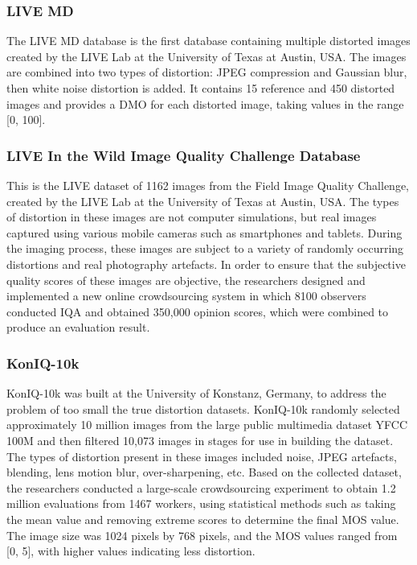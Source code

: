 \documentclass{article}
\begin{document}
\subsubsection{LIVE MD}
\label{LIVE MD}

The LIVE MD database \cite{jayaraman2012objective} is the first database containing multiple distorted images created by the LIVE Lab at the University of Texas at Austin, USA. The images are combined into two types of distortion: JPEG compression and Gaussian blur, then white noise distortion is added. It contains 15 reference and 450 distorted images and provides a DMO for each distorted image, taking values in the range [0, 100].

\subsubsection{LIVE In the Wild Image Quality Challenge Database}
\label{LIVE WILD}

This is the LIVE dataset \cite{ghadiyaram2015massive} of 1162 images from the Field Image Quality Challenge, created by the LIVE Lab at the University of Texas at Austin, USA. The types of distortion in these images are not computer simulations, but real images captured using various mobile cameras such as smartphones and tablets. During the imaging process, these images are subject to a variety of randomly occurring distortions and real photography artefacts. In order to ensure that the subjective quality scores of these images are objective, the researchers designed and implemented a new online crowdsourcing system in which 8100 observers conducted IQA and obtained 350,000 opinion scores, which were combined to produce an evaluation result.

\subsubsection{KonIQ-10k}
\label{K-10k}
KonIQ-10k \cite{lin2018koniq} was built at the University of Konstanz, Germany, to address the problem of too small the true distortion datasets. KonIQ-10k randomly selected approximately 10 million images from the large public multimedia dataset YFCC 100M \cite{thomee2016yfcc100m} and then filtered 10,073 images in stages for use in building the dataset. The types of distortion present in these images included noise, JPEG artefacts, blending, lens motion blur, over-sharpening, etc. Based on the collected dataset, the researchers conducted a large-scale crowdsourcing experiment to obtain 1.2 million evaluations from 1467 workers, using statistical methods such as taking the mean value and removing extreme scores to determine the final MOS value. The image size was 1024 pixels by 768 pixels, and the MOS values ranged from [0, 5], with higher values indicating less distortion.
\end{document}
